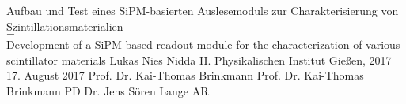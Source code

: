 \LMUTitle
	{Aufbau und Test eines SiPM-basierten Auslesemoduls zur Charakterisierung von Szintillationsmaterialien \\ $-$ \\ 
	Development of a SiPM-based readout-module for the characterization of various scintillator materials }               %
	{Lukas Nies }                       %
	{Nidda}                             %
	{II. Physikalischen Institut}                         %
	{Gie\ss{}en, 2017}                          %
	{17. August 2017}                            %
	{Prof. Dr. Kai-Thomas Brinkmann}
	{Prof. Dr. Kai-Thomas Brinkmann}                          %
	{PD Dr. Jens S{\"o}ren Lange AR }                         %